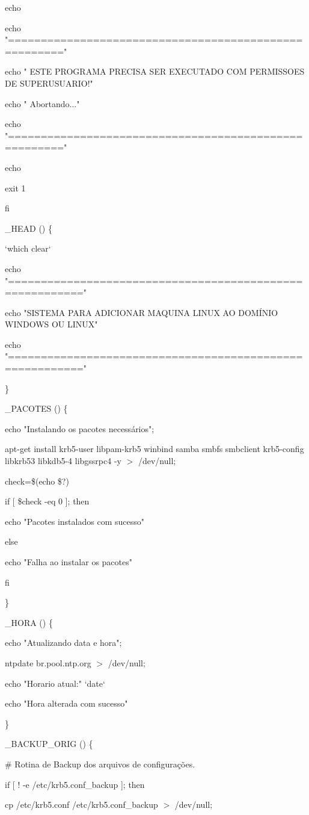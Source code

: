  	echo

  echo "======================================================"

  echo " ESTE PROGRAMA PRECISA SER EXECUTADO COM PERMISSOES DE SUPERUSUARIO!"  

  echo " Abortando..."

  echo "======================================================"

  echo

  exit 1

fi

\_HEAD () \{

`which clear`

echo "========================================================="

echo "SISTEMA PARA ADICIONAR MAQUINA LINUX AO DOMÍNIO WINDOWS OU LINUX"

echo "========================================================="

\}

\_PACOTES () \{

        echo "Instalando os pacotes necessários";       


  apt-get install krb5-user libpam-krb5 winbind samba smbfs smbclient krb5-config libkrb53 libkdb5-4 libgssrpc4 -y $>$ /dev/null;
  
      check=\$(echo \$?)

        if [ \$check -eq 0 ]; then

           echo "Pacotes instalados com sucesso"

        else

           echo "Falha ao instalar os pacotes"

        fi

\}

\_HORA () \{

        echo "Atualizando data e hora";

        ntpdate br.pool.ntp.org $>$ /dev/null;

        echo "Horario atual:" `date`

        echo "Hora alterada com sucesso"

\}

\_BACKUP\_ORIG () \{

  \# Rotina de Backup dos arquivos de configurações.

	if [ ! -e /etc/krb5.conf\_backup ]; then

		cp /etc/krb5.conf /etc/krb5.conf\_backup $>$ /dev/null;

